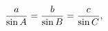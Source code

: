 \[\frac{a}{\mathop{\sin\/}\nolimits A}=\frac{b}{\mathop{\sin\/}\nolimits B}=%
\frac{c}{\mathop{\sin\/}\nolimits C},\]